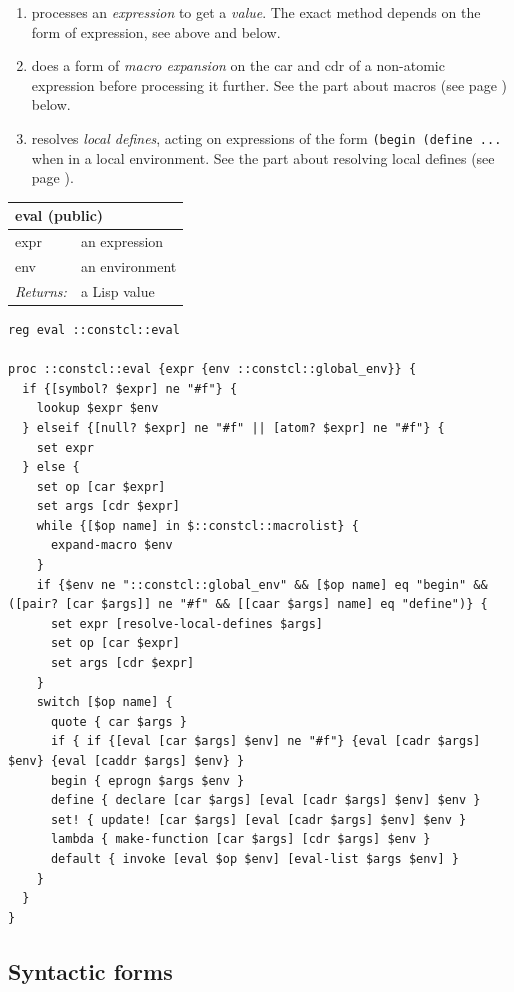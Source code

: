 \documentclass[twoside,9pt]{report}
\begin{document}
\begin{enumerate}
\item  processes an \emph{expression} to get a \emph{value}. The exact method depends on the form of expression, see above and below.
\item  does a form of \emph{macro expansion} on the car and cdr of a non-atomic expression before processing it further. See the part about macros (see page \pageref{macros}) below.
\item  resolves \emph{local defines}, acting on expressions of the form \texttt{(begin (define ...} when in a local environment. See the part about resolving local defines (see page \pageref{resolving-local-defines}).
\end{enumerate}
\begin{tabular}{ |l l| }
\hline
\multicolumn{2}{|l|}{eval (public)} \\
\hline
expr & an expression \\
env & an environment \\
\textit{Returns:} & a Lisp value \\
\hline
\end{tabular}

\noindent\makebox[\linewidth]{\rule{\linewidth}{0.4pt}}
\begin{lstlisting}
reg eval ::constcl::eval
 
proc ::constcl::eval {expr {env ::constcl::global_env}} {
  if {[symbol? $expr] ne "#f"} {
    lookup $expr $env
  } elseif {[null? $expr] ne "#f" || [atom? $expr] ne "#f"} {
    set expr
  } else {
    set op [car $expr]
    set args [cdr $expr]
    while {[$op name] in $::constcl::macrolist} {
      expand-macro $env
    }
    if {$env ne "::constcl::global_env" && [$op name] eq "begin" && ([pair? [car $args]] ne "#f" && [[caar $args] name] eq "define")} {
      set expr [resolve-local-defines $args]
      set op [car $expr]
      set args [cdr $expr]
    }
    switch [$op name] {
      quote { car $args }
      if { if {[eval [car $args] $env] ne "#f"} {eval [cadr $args] $env} {eval [caddr $args] $env} }
      begin { eprogn $args $env }
      define { declare [car $args] [eval [cadr $args] $env] $env }
      set! { update! [car $args] [eval [cadr $args] $env] $env }
      lambda { make-function [car $args] [cdr $args] $env }
      default { invoke [eval $op $env] [eval-list $args $env] }
    }
  }
}
\end{lstlisting}
\noindent\makebox[\linewidth]{\rule{\linewidth}{0.4pt}}
\subsection{Syntactic forms}
\label{syntactic-forms}
\end{document}
